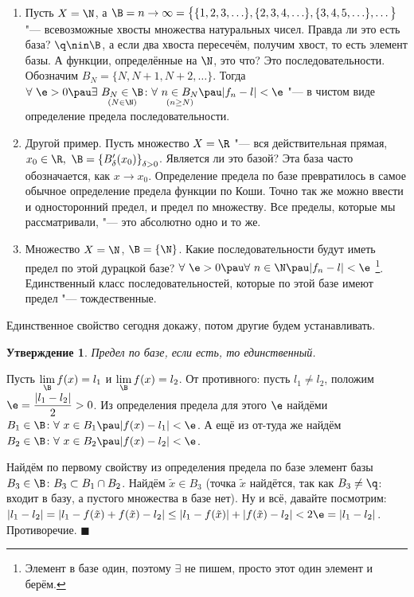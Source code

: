 \documentclass[a4paper,10pt,twoside]{article}
\newtheorem{Ut}{Утверждение}[section]
\newenvironment{Proof}
       {\par\noindent{\textbf{Доказательство.}}}
       {\hfill$\scriptstyle\blacksquare$}
\begin{document}
 \begin{enumerate}
   \item Пусть $X=\N$, а $\B=n\to\infty=\big\{\{1,2,3,\ldots\},\{2,3,4,\ldots\},\{3,4,5,\ldots\},\ldots\big\}$ "--- всевозможные хвосты множества натуральных чисел.
   Правда ли это есть база? $\q\nin\B$, а если два хвоста пересечём, получим хвост, то есть элемент базы. А функции, определённые на $\N$, это что?
   Это последовательности. Обозначим $B_N=\{N,N+1,N+2,\ldots\}$. Тогда
   $\forall\  \e>0\pau \exists\  \underset{(N\in\N)}{B_N\in\B} \colon \forall\ \underset{(n\geq N)}{n\in B_N}\pau |f_n-l|<\e$ "--- в чистом
   виде определение предела последовательности.
   \item Другой пример. Пусть множество $X=\R$ "--- вся действительная прямая, $x_0\in\R,\ \B=\left\{B'_\delta(x_0)\right\}_{\delta>0}$.
   Является ли это базой? Эта база часто обозначается, как $x\to x_0$. Определение предела по базе превратилось в самое обычное определение
   предела функции по Коши. Точно так же можно ввести и односторонний предел, и предел по множеству. Все пределы, которые мы рассматривали, "---
   это абсолютно одно и то же.
   \item Множество $X=\N$, $\B=\{\N\}$. Какие последовательности будут иметь предел по этой дурацкой базе? $\forall\  \e>0\pau \forall\  n\in\N\pau |f_n-l|<\e$
\footnote{Элемент в базе один, поэтому $\exists$ не пишем, просто этот один элемент и берём.}. Единственный класс последовательностей, которые по этой базе
   имеют предел "--- тождественные.
 \end{enumerate} 
 
 Единственное свойство сегодня докажу, потом другие будем устанавливать.
 
 \begin{Ut}
 	Предел по базе, если есть, то единственный.
 \end{Ut}
 
 \begin{Proof}
 	Пусть $\lim\limits_{\B}f(x)=l_1$ и $\lim\limits_{\B}f(x)=l_2$. От противного: пусть $l_1\neq l_2$, положим $\e=\dfrac{|l_1-l_2|}2>0$.
 	Из определения предела для этого $\e$ найдёми $B_1\in\B\colon \forall\  x\in B_1\pau |f(x)-l_1|<\e$. А ещё из от-туда же
 	найдём $B_2\in\B\colon \forall\  x\in B_2\pau |f(x)-l_2|<\e$.
 	
 	Найдём по первому свойству из определения предела по базе элемент базы $B_3\in\B\colon B_3\subset B_1\cap B_2$.
 	Найдём $\tilde x\in B_3$ (точка $\tilde x$ найдётся, так как $B_3\neq\q$: входит в базу, а пустого множества в базе нет). Ну и всё, давайте посмотрим:
 	$|l_1-l_2|=|l_1-f(\tilde x)+f(\tilde x)-l_2|\leq|l_1-f(\tilde x)|+|f(\tilde x)-l_2|<2\e=|l_1-l_2|$. Противоречие.
 \end{Proof}
 
\end{document}
